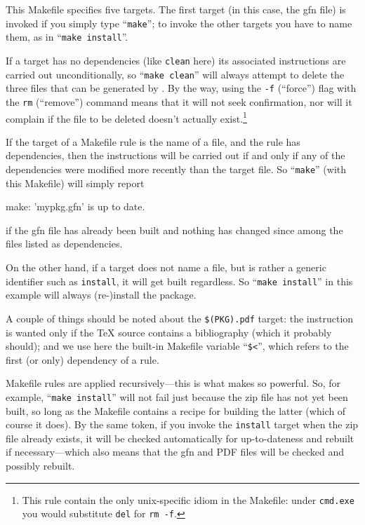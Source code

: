\documentclass[oneside]{book}
\begin{document}
This Makefile specifies five targets. The first target (in this case,
the \textsf{gfn} file) is invoked if you simply type
``\texttt{make}''; to invoke the other targets you have to name them,
as in ``\texttt{make install}''.

If a target has no dependencies (like \texttt{clean} here) its
associated instructions are carried out unconditionally, so
``\texttt{make clean}'' will always attempt to delete the three files
that can be generated by .  By the way, using the
\texttt{-f} (``force'') flag with the \texttt{rm} (``remove'') command
means that it will not seek confirmation, nor will it complain if the
file to be deleted doesn't actually exist.\footnote{This rule contain
  the only unix-specific idiom in the Makefile: under \texttt{cmd.exe}
  you would substitute \texttt{del} for \texttt{rm -f}.}

If the target of a Makefile rule is the name of a file, and the rule
has dependencies, then the instructions will be carried out if and
only if any of the dependencies were modified more recently than the
target file.  So ``\texttt{make}'' (with this Makefile) will simply
report
\begin{code}
make: 'mypkg.gfn' is up to date.
\end{code}
if the \textsf{gfn} file has already been built and nothing has
changed since among the files listed as dependencies.

On the other hand, if a target does not name a file, but is rather a
generic identifier such as \texttt{install}, it will get built
regardless. So ``\texttt{make install}'' in this example will always
(re-)install the package.

A couple of things should be noted about the \texttt{\$(PKG).pdf}
target: the  instruction is wanted only if the \TeX{}
source contains a bibliography (which it probably should); and we use
here the built-in Makefile variable ``\texttt{\$<}'', which refers to
the first (or only) dependency of a rule.

Makefile rules are applied recursively---this is what makes 
so powerful. So, for example, ``\texttt{make install}'' will not fail
just because the \textsf{zip} file has not yet been built, so long as
the Makefile contains a recipe for building the latter (which of
course it does). By the same token, if you invoke the \texttt{install}
target when the \textsf{zip} file already exists, it will be checked
automatically for up-to-dateness and rebuilt if necessary---which also
means that the \textsf{gfn} and PDF files will be checked and possibly
rebuilt.
\end{document}
